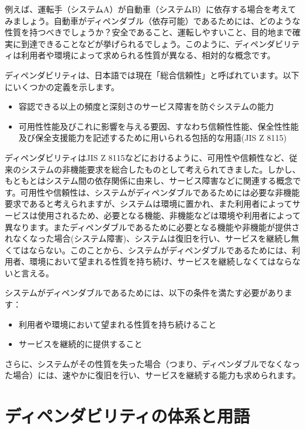 例えば、運転手（システムA）が自動車（システムB）に依存する場合を考えてみましょう。自動車がディペンダブル（依存可能）であるためには、どのような性質を持つべきでしょうか？安全であること、運転しやすいこと、目的地まで確実に到達できることなどが挙げられるでしょう。このように、ディペンダビリティは利用者や環境によって求められる性質が異なる、相対的な概念です。

ディペンダビリティは、日本語では現在「総合信頼性」と呼ばれています。以下にいくつかの定義を示します。

\begin{itemize}
\item 容認できる以上の頻度と深刻さのサービス障害を防ぐシステムの能力
\item 可用性性能及びこれに影響を与える要因、すなわち信頼性性能、保全性性能及び保全支援能力を記述するために用いられる包括的な用語(JIS Z 8115)
\end{itemize}

ディペンダビリティはJIS Z 8115などにおけるように、可用性や信頼性など、従来のシステムの非機能要求を総合したものとして考えられてきました。しかし、もともとはシステム間の依存関係に由来し、サービス障害などに関連する概念です。可用性や信頼性は、システムがディペンダブルであるためには必要な非機能要求であると考えられますが、システムは環境に置かれ、また利用者によってサービスは使用されるため、必要となる機能、非機能などは環境や利用者によって異なります。またディペンダブルであるために必要となる機能や非機能が提供されなくなった場合(システム障害)、システムは復旧を行い、サービスを継続し無くてはならない。このことから、システムがディペンダブルであるためには、利用者、環境において望まれる性質を持ち続け、サービスを継続しなくてはならないと言える。

システムがディペンダブルであるためには、以下の条件を満たす必要があります：

\begin{itemize}
\item 利用者や環境において望まれる性質を持ち続けること
\item サービスを継続的に提供すること
\end{itemize}

さらに、システムがその性質を失った場合（つまり、ディペンダブルでなくなった場合）には、速やかに復旧を行い、サービスを継続する能力も求められます。

\section{ディペンダビリティの体系と用語}

